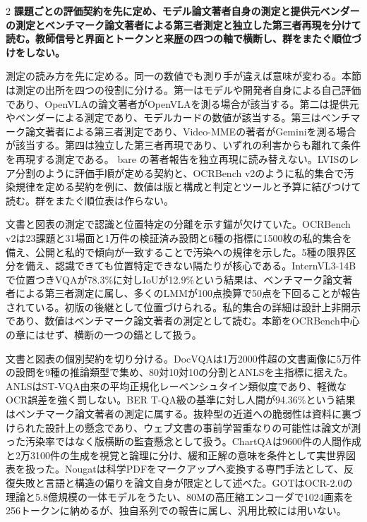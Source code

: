 \documentclass[lualatex,a4paper,10pt]{jlreq}
\begin{document}
\begin{multicols}{2}
\raggedcolumns
\noindent\textbf{課題ごとの評価契約を先に定め、モデル論文著者自身の測定と提供元ベンダーの測定とベンチマーク論文著者による第三者測定と独立した第三者再現を分けて読む。教師信号と界面とトークンと来歴の四つの軸で横断し、群をまたぐ順位づけをしない。}\autocite{vmd110,vmd080,vmd056}\par\medskip
\noindent 測定の読み方を先に定める。同一の数値でも測り手が違えば意味が変わる。本節は測定の出所を四つの役割に分ける。第一はモデルや開発者自身による自己評価であり、OpenVLAの論文著者がOpenVLAを測る場合が該当する。第二は提供元やベンダーによる測定であり、モデルカードの数値が該当する。第三はベンチマーク論文著者による第三者測定であり、Video-MMEの著者がGeminiを測る場合が該当する。第四は独立した第三者再現であり、いずれの利害からも離れて条件を再現する測定である。 bare の著者報告を独立再現に読み替えない。LVISのレア分割のように評価手順が定める契約と、OCRBench v2のように私的集合で汚染規律を定める契約を例に、数値は版と構成と判定とツールと予算に結びつけて読む。群をまたぐ順位表は作らない。\autocite{vmd080,vmd056,vmd110}\par\medskip
\noindent 文書と図表の測定で認識と位置特定の分離を示す錨が欠けていた。OCRBench v2は23課題と31場面と1万件の検証済み設問と6種の指標に1500枚の私的集合を備え、公開と私的で傾向が一致することで汚染への規律を示した。5種の限界区分を備え、認識できても位置特定できない隔たりが核心である。InternVL3-14Bで位置つきVQAが78.3\%に対しIoUが12.9\%という結果は、ベンチマーク論文著者による第三者測定に属し、多くのLMMが100点換算で50点を下回ることが報告されている。初版の後継として位置づけられる。私的集合の詳細は設計上非開示であり、数値はベンチマーク論文著者の測定として読む。本節をOCRBench中心の章にはせず、横断の一つの錨として扱う。\autocite{vmd110}\par\medskip
\noindent 文書と図表の個別契約を切り分ける。DocVQAは1万2000件超の文書画像に5万件の設問を9種の推論類型で集め、80対10対10の分割とANLSを主指標に据えた。ANLSはST-VQA由来の平均正規化レーベンシュタイン類似度であり、軽微なOCR誤差を強く罰しない。BER T-QA級の基準に対し人間が94.36\%という結果はベンチマーク論文著者の測定に属する。抜粋型の近道への脆弱性は資料に裏づけられた設計上の懸念であり、ウェブ文書の事前学習重なりの可能性は論文が測った汚染率ではなく版横断の監査懸念として扱う。ChartQAは9600件の人間作成と2万3100件の生成を視覚と論理に分け、緩和正解の意味を条件として実世界図表を扱った。Nougatは科学PDFをマークアップへ変換する専門手法として、反復失敗と言語と構造の偏りを論文自身が限定として述べた。GOTはOCR-2.0の理論と5.8億規模の一体モデルをうたい、80Mの高圧縮エンコーダで1024画素を256トークンに納めるが、独自系列での報告に属し、汎用比較には用いない。\autocite{vmd108,vmd109,vmd027,vmd028}\par\medskip

\end{multicols}
\end{document}
